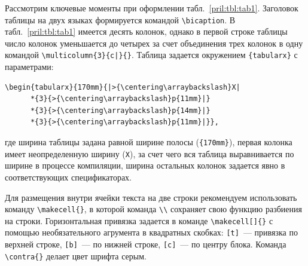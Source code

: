 \documentclass[10pt,a4paper]{book}
\begin{document}
Рассмотрим ключевые моменты при оформлении табл.~\ref{pril:tbl:tab1}. 
Заголовок таблицы на двух языках формируется командой \verb!\bicaption!.
В табл.~\ref{pril:tbl:tab1} имеется десять колонок, однако в первой строке таблицы
число колонок уменьшается до четырех за счет объединения трех колонок в одну
командой \verb!\multicolumn{3}{c|}{}!. Таблица задается окружением \verb!{tabularx}!
с параметрами:
\begin{verbatim}
\begin{tabularx}{170mm}{|>{\centering\arraybackslash}X|
      *{3}{>{\centering\arraybackslash}p{11mm}|}
      *{3}{>{\centering\arraybackslash}p{14mm}|}
      *{3}{>{\centering\arraybackslash}p{11mm}|}},
\end{verbatim}
где ширина таблицы задана равной ширине полосы (\verb!{170mm}!), 
первая колонка имеет неопределенную ширину (\verb!X!), за счет чего вся таблица выравнивается
по ширине в процессе компиляции, ширина остальных колонок задается явно в соответствующих
спецификаторах.

Для размещения внутри ячейки текста на две строки рекомендуем использовать команду
\verb!\makecell{}!, в которой команда \verb!\\! сохраняет свою функцию разбиения на строки.
Горизонтальная привязка задается в команде \verb!\makecell[]{}! с помощью необязательного
агрумента в квадратных скобках: 
\verb![t]!~--- привязка по верхней строке,
\verb![b]!~--- по нижней строке,
\verb![c]!~--- по центру блока.
Команда \verb!\contra{}! делает цвет шрифта серым.
\end{document}
